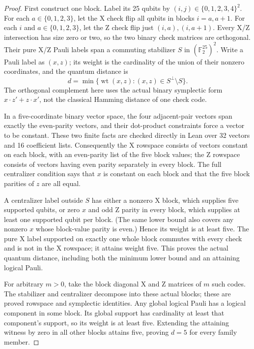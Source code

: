 \documentclass[11pt]{article}
\newcommand{\F}{\mathbb F_2}
\begin{document}
\begin{proof}
First construct one block. Label its 25 qubits by $(i,j)\in\{0,1,2,3,4\}^2$.
For each $a\in\{0,1,2,3\}$, let the X check flip all qubits in blocks
$i=a,a+1$. For each $i$ and $a\in\{0,1,2,3\}$, let the Z check flip just
$(i,a),(i,a+1)$. Every X/Z intersection has size zero or two, so the two
binary check matrices are orthogonal. Their pure X/Z Pauli labels span a
commuting stabilizer $S$ in $(\F^{25})^2$. Write a Pauli label as $(x,z)$;
its weight is the cardinality of the union of their nonzero coordinates,
and the quantum distance is
\[
 d=\min\{\operatorname{wt}(x,z):(x,z)\in S^\perp\setminus S\}.
\]
The orthogonal complement here uses the actual binary symplectic form
$x\cdot z'+z\cdot x'$, not the classical Hamming distance of one check code.

In a five-coordinate binary vector space, the four adjacent-pair vectors
span exactly the even-parity vectors, and their dot-product constraints
force a vector to be constant. These two finite facts are checked directly
in Lean over 32 vectors and 16 coefficient lists. Consequently the X
rowspace consists of vectors constant on each block, with an even-parity
list of the five block values; the Z rowspace consists of vectors having
even parity separately in every block. The full centralizer condition
says that $x$ is constant on each block and that the five block parities
of $z$ are all equal.

A centralizer label outside $S$ has either a nonzero X block, which supplies
five supported qubits, or zero $x$ and odd Z parity in every block, which
supplies at least one supported qubit per block. (The same lower bound
also covers any nonzero $x$ whose block-value parity is even.) Hence its
weight is at least five. The pure X label supported on exactly one whole
block commutes with every check and is not in the X rowspace; it attains
weight five. This proves the actual quantum distance, including both the
minimum lower bound and an attaining logical Pauli.

For arbitrary $m>0$, take the block diagonal X and Z matrices of $m$ such
codes. The stabilizer and centralizer decompose into these actual blocks;
these are proved rowspace and symplectic identities. Any global logical
Pauli has a logical component in some block. Its global support has
cardinality at least that component's support, so its weight is at least
five. Extending the attaining witness by zero in all other blocks attains
five, proving $d=5$ for every family member.


\end{proof}
\end{document}
